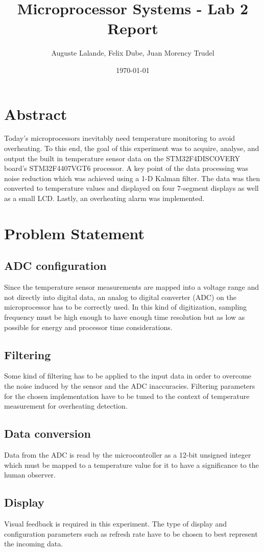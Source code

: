 \documentclass[12pt]{article}
\title{Microprocessor Systems - Lab 2 Report}
\author{Auguste Lalande, Felix Dube, Juan Morency Trudel}
\date{\today}
\begin{document}
\maketitle
\clearpage

\tableofcontents
\clearpage

\section{Abstract}
Today's microprocessors inevitably need temperature monitoring to avoid overheating. To this end, the goal of this experiment was to acquire, analyse, and output the built in temperature sensor data on the STM32F4DISCOVERY board's STM32F4407VGT6 processor. A key point of the data processing was noise reduction which was achieved using a 1-D Kalman filter. The data was then converted to temperature values and displayed on four 7-segment displays as well as a small LCD. Lastly, an overheating alarm was implemented.

\section{Problem Statement}
\subsection{ADC configuration} Since the temperature sensor measurements are mapped into a voltage range and not directly into digital data, an analog to digital converter (ADC) on the microprocessor has to be correctly used. In this kind of digitization, sampling frequency must be high enough to have enough time resolution but as low as possible for energy and processor time considerations.
\subsection{Filtering}
Some kind of filtering has to be applied to the input data in order to overcome the noise induced by the sensor and the ADC inaccuracies. Filtering parameters for the chosen implementation have to be tuned to the context of temperature measurement for overheating detection.
\subsection{Data conversion}
Data from the ADC is read by the microcontroller as a 12-bit unsigned integer which must be mapped to a temperature value for it to have a significance to the human observer.
\subsection{Display}
Visual feedback is required in this experiment. The type of display and configuration parameters such as refresh rate have to be chosen to best represent the incoming data.
\end{document}
